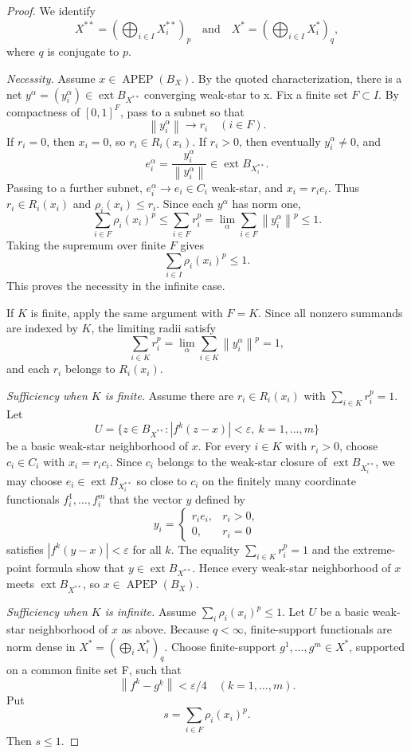 \documentclass[11pt]{article}
\newcommand{\APEP}{\operatorname{APEP}}
\newcommand{\ext}{\operatorname{ext}}
\newcommand{\Ball}{B}
\newcommand{\norm}[1]{\left\lVert #1 \right\rVert}
\begin{document}
\begin{proof}
We identify
\[
  X^{**}=\left(\bigoplus_{i\in I}X_i^{**}\right)_p
  \quad\text{and}\quad
  X^*=\left(\bigoplus_{i\in I}X_i^*\right)_q,
\]
where $q$ is conjugate to $p$.

\smallskip
\noindent\emph{Necessity.}
Assume $x\in\APEP(\Ball_X)$. By the quoted characterization, there is a
net $y^\alpha=(y_i^\alpha)\in\ext\Ball_{X^{**}}$ converging weak-star to
x. Fix a finite set $F\subset I$. By compactness of $[0,1]^F$, pass to a
subnet so that
\[
  \norm{y_i^\alpha}\to r_i
  \quad (i\in F).
\]
If $r_i=0$, then $x_i=0$, so $r_i\in R_i(x_i)$. If $r_i>0$, then
eventually $y_i^\alpha\neq0$, and
\[
  e_i^\alpha=\frac{y_i^\alpha}{\norm{y_i^\alpha}}
  \in\ext\Ball_{X_i^{**}}.
\]
Passing to a further subnet, $e_i^\alpha\to e_i\in C_i$ weak-star, and
$x_i=r_i e_i$. Thus $r_i\in R_i(x_i)$ and
$\rho_i(x_i)\le r_i$.
Since each $y^\alpha$ has norm one,
\[
  \sum_{i\in F}\rho_i(x_i)^p
  \le
  \sum_{i\in F}r_i^p
  =
  \lim_\alpha\sum_{i\in F}\norm{y_i^\alpha}^p
  \le 1.
\]
Taking the supremum over finite $F$ gives
\[
  \sum_{i\in I}\rho_i(x_i)^p\le 1.
\]
This proves the necessity in the infinite case.

If $K$ is finite, apply the same argument with $F=K$. Since all nonzero
summands are indexed by $K$, the limiting radii satisfy
\[
  \sum_{i\in K}r_i^p
  =
  \lim_\alpha \sum_{i\in K}\norm{y_i^\alpha}^p
  =1,
\]
and each $r_i$ belongs to $R_i(x_i)$.

\smallskip
\noindent\emph{Sufficiency when $K$ is finite.}
Assume there are $r_i\in R_i(x_i)$ with $\sum_{i\in K}r_i^p=1$.
Let
\[
  U=\{z\in\Ball_{X^{**}}:|f^k(z-x)|<\varepsilon,\ k=1,\ldots,m\}
\]
be a basic weak-star neighborhood of $x$.
For every $i\in K$ with $r_i>0$, choose $c_i\in C_i$ with $x_i=r_i c_i$.
Since $c_i$ belongs to the weak-star closure of $\ext\Ball_{X_i^{**}}$,
we may choose $e_i\in\ext\Ball_{X_i^{**}}$ so close to $c_i$ on the
finitely many coordinate functionals $f_i^1,\ldots,f_i^m$ that the vector
$y$ defined by
\[
  y_i=
  \begin{cases}
    r_i e_i, & r_i>0,\\
    0, & r_i=0
  \end{cases}
\]
satisfies $|f^k(y-x)|<\varepsilon$ for all $k$.
The equality $\sum_{i\in K}r_i^p=1$ and the extreme-point formula show
that $y\in\ext\Ball_{X^{**}}$. Hence every weak-star neighborhood of
$x$ meets $\ext\Ball_{X^{**}}$, so $x\in\APEP(\Ball_X)$.

\smallskip
\noindent\emph{Sufficiency when $K$ is infinite.}
Assume $\sum_i\rho_i(x_i)^p\le1$. Let $U$ be a basic weak-star
neighborhood of $x$ as above. Because $q<\infty$, finite-support
functionals are norm dense in $X^*=(\bigoplus_i X_i^*)_q$. Choose
finite-support $g^1,\ldots,g^m\in X^*$, supported on a common finite set
F, such that
\[
  \norm{f^k-g^k}<\varepsilon/4
  \quad (k=1,\ldots,m).
\]
Put
\[
  s=\sum_{i\in F}\rho_i(x_i)^p.
\]
Then $s\le1$.


\end{proof}
\end{document}

